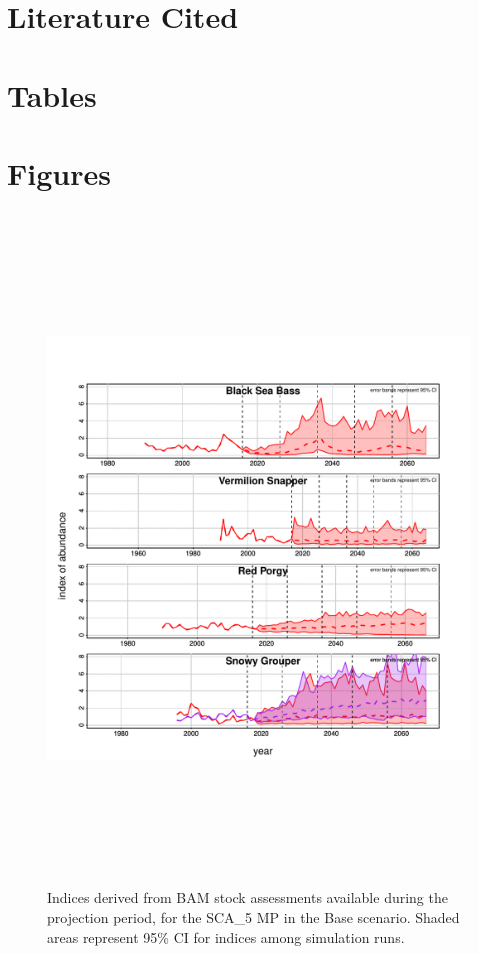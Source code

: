 \documentclass[12pt,english]{article}
\begin{document}
\clearpage
\section*{Literature Cited}
\renewcommand{\refname}{}
\vspace{-1cm}




\newpage
\section*{Tables}

%


\newpage
\section*{Figures}

\begin{figure}[!ht]
\begin{center}
\includegraphics[width=6in,height=7in]{../Figs/AddInd.pdf}
\end{center}
\begin{flushleft}
\caption{Indices derived from BAM stock assessments available during the projection period, for the SCA\_5 MP in the Base scenario. Shaded areas represent 95\% CI for indices among simulation runs.}
\label{fig:AddInd}
\end{flushleft}
\end{figure}
\end{document}
